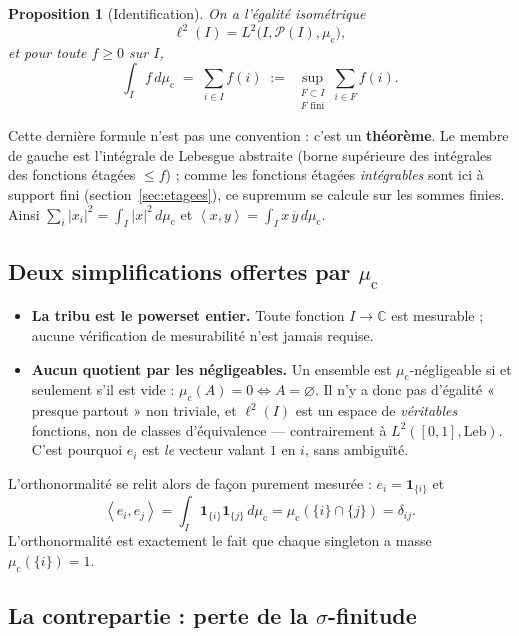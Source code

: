 \documentclass[11pt,a4paper]{article}
\theoremstyle{plain}
\newtheorem{proposition}[theoreme]{Proposition}
\theoremstyle{definition}
\newcommand{\C}{\mathbb{C}}
\newcommand{\abs}[1]{\left\lvert #1 \right\rvert}
\newcommand{\scal}[2]{\left\langle #1 , #2 \right\rangle}
\newcommand{\muc}{\mu_{\mathrm{c}}}
\begin{document}
\begin{proposition}[Identification]\label{prop:ident}
On a l'égalité isométrique
\[
  \ell^2(I) = L^2\bigl(I, \mathscr{P}(I), \muc\bigr),
\]
et pour toute $f \ge 0$ sur $I$,
\[
  \int_I f \, d\muc \;=\; \sum_{i\in I} f(i)
     \;:=\; \sup_{\substack{F \subset I \\ F \text{ fini}}} \sum_{i\in F} f(i).
\]
\end{proposition}

Cette dernière formule n'est pas une convention : c'est un \textbf{théorème}. Le
membre de gauche est l'intégrale de Lebesgue abstraite (borne supérieure des
intégrales des fonctions étagées $\le f$) ; comme les fonctions étagées
\emph{intégrables} sont ici à support fini (section~\ref{sec:etagees}), ce
supremum se calcule sur les sommes finies. Ainsi $\sum_i \abs{x_i}^2 =
\int_I \abs{x}^2 \, d\muc$ et $\scal{x}{y} = \int_I x\,\overline{y}\, d\muc$.

\subsection{Deux simplifications offertes par $\muc$}

\begin{itemize}[leftmargin=1.4em]
  \item \textbf{La tribu est le powerset entier.} Toute fonction $I \to \C$ est
        mesurable ; aucune vérification de mesurabilité n'est jamais requise.
  \item \textbf{Aucun quotient par les négligeables.} Un ensemble est
        $\muc$-négligeable si et seulement s'il est vide :
        $\muc(A) = 0 \iff A = \varnothing$. Il n'y a donc pas d'égalité
        « presque partout » non triviale, et $\ell^2(I)$ est un espace de
        \emph{véritables} fonctions, non de classes d'équivalence — contrairement
        à $L^2([0,1],\text{Leb})$. C'est pourquoi $e_i$ est \emph{le} vecteur
        valant $1$ en $i$, sans ambiguïté.
\end{itemize}

L'orthonormalité se relit alors de façon purement mesurée : $e_i = \mathbf{1}_{\{i\}}$ et
\[
  \scal{e_i}{e_j} = \int_I \mathbf{1}_{\{i\}}\mathbf{1}_{\{j\}}\, d\muc
     = \muc(\{i\}\cap\{j\}) = \delta_{ij}.
\]
L'orthonormalité est exactement le fait que chaque singleton a masse
$\muc(\{i\}) = 1$.

\subsection{La contrepartie : perte de la $\sigma$-finitude}
\end{document}
